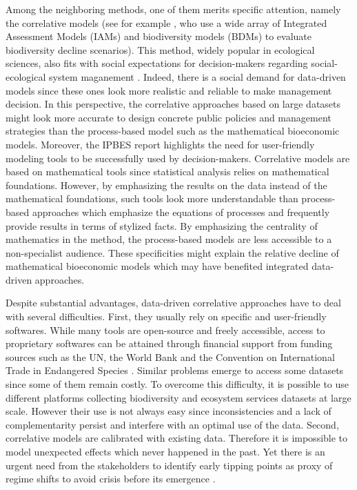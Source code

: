 Among the neighboring methods, one of them merits specific attention, namely the correlative models (see for example \cite{Leclere2020}, who use a wide array of Integrated Assessment Models (IAMs) and biodiversity models (BDMs) to evaluate biodiversity decline scenarios). This method, widely popular in ecological sciences, also fits with social expectations for decision-makers regarding social-ecological system maganement \citep{IPBES2016}. Indeed, there is a social demand for data-driven models since these ones look more realistic and reliable to make management decision. In this perspective, the correlative approaches based on large datasets might look more accurate to design concrete public policies and management strategies than the process-based model such as the mathematical bioeconomic models. Moreover, the IPBES report highlights the need for user-friendly modeling tools to be successfully used by decision-makers. Correlative models are based on mathematical tools since statistical analysis relies on mathematical foundations. However, by emphasizing the results on the data instead of the mathematical foundations, such tools look more understandable than process-based approaches which emphasize the equations of processes and frequently provide results in terms of stylized facts. By emphasizing the centrality of mathematics in the method, the process-based models are less accessible to a non-specialist audience.  These specificities might explain the relative decline of mathematical bioeconomic models which may have benefited integrated data-driven approaches.

Despite substantial advantages, data-driven correlative approaches have to deal with several difficulties. First, they usually rely on specific and user-friendly softwares. While many tools are open-source and freely accessible, access to proprietary softwares can be attained through financial support from funding sources such as the UN, the World Bank and the Convention on International Trade in Endangered Species \citep{IPBES2016}. Similar problems emerge to access some datasets since some of them remain costly. To overcome this difficulty, it is possible to use different platforms collecting biodiversity and ecosystem services datasets at large scale. However their use is not always easy since inconsistencies and a lack of complementarity persist and interfere with an optimal use of the data. Second, correlative models are calibrated with existing data. Therefore it is impossible to model unexpected effects which never happened in the past. Yet there is an urgent need from the stakeholders to identify early tipping points as proxy of regime shifts to avoid crisis before its emergence \citep{Zimmermann2009}. 

